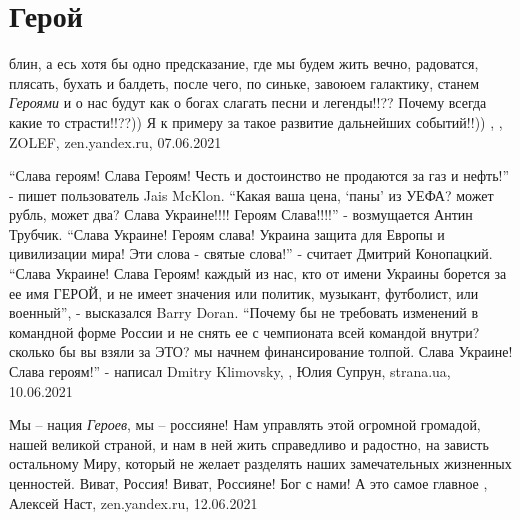  
 
 
 
 
\chapter{Герой}
\label{sec:slova.geroj}

блин, а есь хотя бы одно предсказание, где мы будем жить вечно, радоватся,
плясать, бухать и балдеть, после чего, по синьке, завоюем галактику, станем
\emph{Героями} и о нас будут как о богах слагать песни и легенды!!?? Почему
всегда какие то страсти!!??)) Я к примеру за такое развитие дальнейших
событий!!))
,
, ZOLEF, zen.yandex.ru, 07.06.2021

\enquote{Слава героям! Слава Героям! Честь и достоинство не продаются за газ и
нефть!} - пишет пользователь Jais McKlon. \enquote{Какая ваша цена,
\enquote{паны} из УЕФА? может рубль, может два? Слава Украине!!!! Героям
Слава!!!!} - возмущается Антин Трубчик. \enquote{Слава Украине! Героям слава!
Украина защита для Европы и цивилизации мира! Эти слова - святые слова!} -
считает Дмитрий Конопацкий.  \enquote{Слава Украине! Слава Героям! каждый из
нас, кто от имени Украины борется за ее имя ГЕРОЙ, и не имеет значения или
политик, музыкант, футболист, или военный}, - высказался Barry Doran.
\enquote{Почему бы не требовать изменений в командной форме России и не снять
ее с чемпионата всей командой внутри? сколько бы вы взяли за ЭТО? мы начнем
финансирование толпой. Слава Украине! Слава героям!} - написал Dmitry
Klimovsky,
, Юлия Супрун, strana.ua, 10.06.2021

Мы -- нация \emph{Героев}, мы -- россияне! Нам управлять этой огромной громадой, нашей
великой страной, и нам в ней жить справедливо и радостно, на зависть остальному
Миру, который не желает разделять наших замечательных жизненных ценностей.
Виват, Россия! Виват, Россияне! Бог с нами! А это самое главное
, 
Алексей Наст, zen.yandex.ru, 12.06.2021

